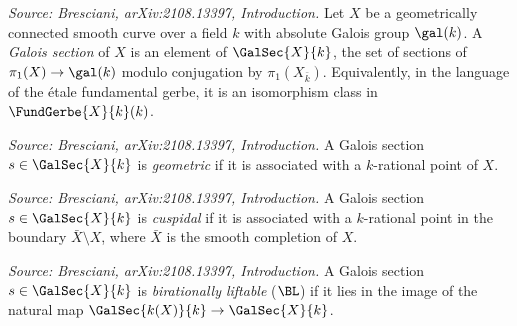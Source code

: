 \begin{definition}[GaloisSection]
  \label{def:galois-section}
  \textit{Source: Bresciani, arXiv:2108.13397, Introduction.}
  Let \(X\) be a geometrically connected smooth curve over a field \(k\) with absolute
  Galois group \(\gal(k)\). A \emph{Galois section} of \(X\) is an element of
  \(\GalSec{X}{k}\), the set of sections of \(\pi_1(X) \to \gal(k)\) modulo conjugation
  by \(\pi_1(X_{\bar{k}})\). Equivalently, in the language of the étale fundamental
  gerbe, it is an isomorphism class in \(\FundGerbe{X}{k}(k)\).
\end{definition}

\begin{definition}[GeometricSection]
  \label{def:geometric-section}
  \textit{Source: Bresciani, arXiv:2108.13397, Introduction.}
  A Galois section \(s \in \GalSec{X}{k}\) is \emph{geometric} if it is associated
  with a \(k\)-rational point of \(X\).
\end{definition}

\begin{definition}[CuspidalSection]
  \label{def:cuspidal-section}
  \textit{Source: Bresciani, arXiv:2108.13397, Introduction.}
  A Galois section \(s \in \GalSec{X}{k}\) is \emph{cuspidal} if it is associated
  with a \(k\)-rational point in the boundary \(\bar{X} \setminus X\), where
  \(\bar{X}\) is the smooth completion of \(X\).
\end{definition}

\begin{definition}[BiratLiftable]
  \label{def:birl}
  \textit{Source: Bresciani, arXiv:2108.13397, Introduction.}
  A Galois section \(s \in \GalSec{X}{k}\) is \emph{birationally liftable} (\(\BL\))
  if it lies in the image of the natural map \(\GalSec{k(X)}{k} \to \GalSec{X}{k}\).
\end{definition}

